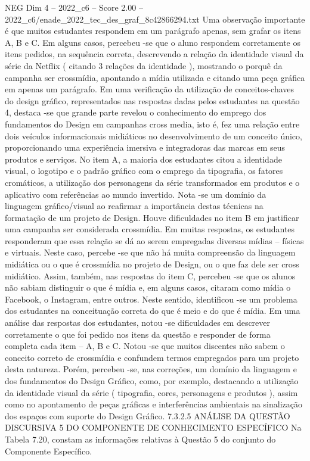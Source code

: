 \begin{textsample}{NEG Dim 4 – 2022\_c6 – Score 2.00 – 2022\_c6/enade\_2022\_tec\_des\_graf\_8c42866294.txt}
Uma observação importante é que muitos estudantes respondem em um parágrafo apenas, sem grafar os itens A, B e C.
Em alguns casos, percebeu -se que o aluno respondem corretamente os itens pedidos, na sequência correta, descrevendo a relação da identidade visual da série da Netflix ( citando 3 relações da identidade ), mostrando o porquê da campanha ser crossmídia, apontando a mídia utilizada e citando uma peça gráfica em apenas um parágrafo.
Em uma verificação da utilização de conceitos-chaves do design gráfico, representados nas respostas dadas pelos estudantes na questão 4, destaca -se que grande parte revelou o conhecimento do emprego dos fundamentos do Design em campanhas cross media, isto é, fez uma relação entre dois veículos informacionais midiáticos no desenvolvimento de um conceito único, proporcionando uma experiência imersiva e integradoras das marcas em seus produtos e serviços.
No item A, a maioria dos estudantes citou a identidade visual, o logotipo e o padrão gráfico com o emprego da tipografia, os fatores cromáticos, a utilização dos personagens da série transformados em produtos e o aplicativo com referências ao mundo invertido.
Nota -se um domínio da linguagem gráfico/visual ao reafirmar a importância destas técnicas na formatação de um projeto de Design.
Houve dificuldades no item B em justificar uma campanha ser considerada crossmídia.
Em muitas respostas, os estudantes responderam que essa relação se dá ao serem empregadas diversas mídias – físicas e virtuais.
Neste caso, percebe -se que não há muita compreensão da linguagem midiática ou o que é crossmídia no projeto de Design, ou o que faz dele ser cross midiático.
Assim, também, nas respostas do item C, percebeu -se que os alunos não sabiam distinguir o que é mídia e, em alguns casos, citaram como mídia o Facebook, o Instagram, entre outros.
Neste sentido, identificou -se um problema dos estudantes na conceituação correta do que é meio e do que é mídia.
Em uma análise das respostas dos estudantes, notou -se dificuldades em descrever corretamente o que foi pedido nos itens da questão e responder de forma completa cada item – A, B e C.
Notou -se que muitos discentes não sabem o conceito correto de crossmídia e confundem termos empregados para um projeto desta natureza.
Porém, percebeu -se, nas correções, um domínio da linguagem e dos fundamentos do Design Gráfico, como, por exemplo, destacando a utilização da identidade visual da série ( tipografia, cores, personagens e produtos ), assim como no apontamento de peças gráficas e interferências ambientais na sinalização dos espaços com suporte do Design Gráfico. 7.3.2.5 ANÁLISE DA QUESTÃO DISCURSIVA 5 DO COMPONENTE DE CONHECIMENTO ESPECÍFICO Na Tabela 7.20, constam as informações relativas à Questão 5 do conjunto do Componente Específico.

\end{textsample}
